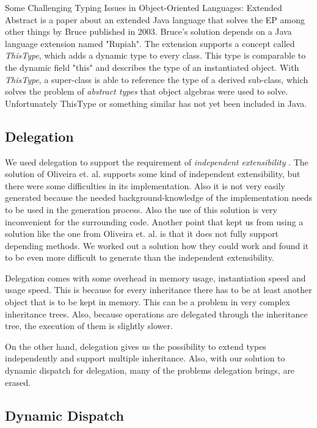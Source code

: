\documentclass{report}
\begin{document}
{Some Challenging Typing Issues in Object-Oriented Languages: Extended Abstract} is a paper about an extended Java language that solves the EP among other things by Bruce published in 2003\cite{Bruce-Typing-2003}.
Bruce's solution depends on a Java language extension named "Rupiah"\cite{Foster-Rupiah-2001}. The extension supports a concept called \emph{ThisType}, which adds a dynamic type to every class. This type is comparable to the dynamic field "this" and describes the type of an instantiated object. With \emph{ThisType}, a super-class is able to reference the type of a derived sub-class, which solves the problem of \emph{abstract types} that object algebras were used to solve. Unfortunately ThisType or something similar has not yet been included in Java.

\subsection{Delegation}
We used delegation to support the requirement of \emph{independent extensibility} \cite{Odersky-Expression-2005, Oliv-Extensibility-2012}. The solution of Oliveira et. al. supports some kind of independent extensibility, but there were some difficulties in its implementation. Also it is not very easily generated because the needed background-knowledge of the implementation needs to be used in the generation process. Also the use of this solution is very inconvenient for the surrounding code. Another point that kept us from using a solution like the one from Oliveira et. al. is that it does not fully support depending methods. We worked out a solution how they could work and found it to be even more difficult to generate than the independent extensibility.

Delegation comes with some overhead in memory usage, instantiation speed and usage speed. This is because for every inheritance there has to be at least another object that is to be kept in memory. This can be a problem in very complex inheritance trees. Also, because operations are delegated through the inheritance tree, the execution of them is slightly slower.

On the other hand, delegation gives us the possibility to extend types independently and support multiple inheritance. Also, with our solution to dynamic dispatch for delegation, many of the problems delegation brings, are erased.

\subsection{Dynamic Dispatch}
\label{discussionDynamicDispatch}
\end{document}
